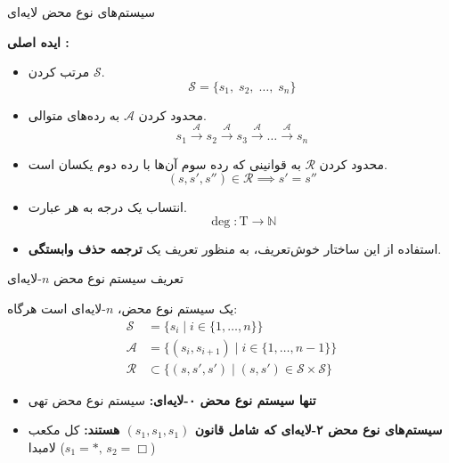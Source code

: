 \documentclass[12pt, aspectratio=169]{beamer}
\begin{document}
\begin{frame}{سیستم‌های نوع محض لایه‌ای}

\textbf{ایده اصلی :}

{\scriptsize
  \begin{itemize}
    \item مرتب کردن $\mathcal{S}$.
    \begin{equation*}
    \mathcal{S} = \{s_1,\; s_2 ,\; \dots,\;s_n\}
    \end{equation*}
    \item محدود کردن $\mathcal{A}$ به رده‌های متوالی.
    \begin{equation*}
    s_1 \overset{\mathcal{A}}{\longrightarrow} s_2 \overset{\mathcal{A}}{\longrightarrow} s_3 \overset{\mathcal{A}}{\longrightarrow} \dots \overset{\mathcal{A}}{\longrightarrow} s_n
    \end{equation*}
    \item محدود کردن $\mathcal{R}$ به قوانینی که رده سوم آن‌ها با رده دوم یکسان است.
    \begin{equation*}
    (s,s',s'') \in \mathcal{R} \implies s' = s''
    \end{equation*}
    \item انتساب یک درجه‌ به هر عبارت.
    \begin{equation*}
    \operatorname{deg}: \mathrm{T} \to \mathbb{N}
    \end{equation*}
    \item استفاده از این ساختار خوش‌تعریف، به منظور تعریف یک \textbf{ترجمه حذف وابستگی}.
  \end{itemize}
}

\end{frame}

\begin{frame}{تعریف سیستم نوع محض $n$-لایه‌ای}

یک سیستم نوع محض، $n$-لایه‌ای است هرگاه:
\begin{align*}
\mathcal{S} &= \{ s_i \mid i \in \{1,\dots,n\} \}\\
\mathcal{A} &= \{ (s_i,s_{i+1}) \mid i \in \{1,\dots,n{-}1\} \}\\
\mathcal{R} &\subset \{ (s,s',s') \mid (s,s') \in \mathcal{S} \times \mathcal{S} \}
\end{align*}

\vfil
{\scriptsize
\begin{itemize}
  \item \textbf{تنها سیستم نوع محض ۰-لایه‌ای:} سیستم نوع محض تهی
  \item \textbf{سیستم‌های نوع محض ۲-لایه‌ای که شامل قانون $(s_1, s_1, s_1)$ هستند:} کل مکعب لامبدا ($s_1 = *,\,s_2 = \Box$)
\end{itemize}
}

\end{frame}
\end{document}
